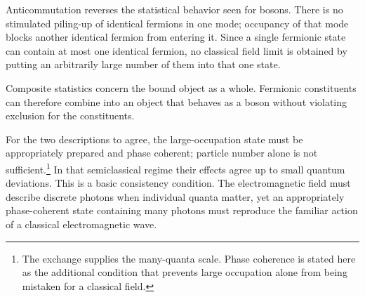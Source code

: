Anticommutation reverses the statistical behavior seen for bosons. There is no stimulated piling-up of identical fermions in one mode; occupancy of that mode blocks another identical fermion from entering it. Since a single fermionic state can contain at most one identical fermion, no classical field limit is obtained by putting an arbitrarily large number of them into that one state.

\begin{classroomqa}
\end{classroomqa}

Composite statistics concern the bound object as a whole. Fermionic constituents can therefore combine into an object that behaves as a boson without violating exclusion for the constituents.

\begin{classroomqa}
\end{classroomqa}

For the two descriptions to agree, the large-occupation state must be appropriately prepared and phase coherent; particle number alone is not sufficient.\footnote{The exchange supplies the many-quanta scale. Phase coherence is stated here as the additional condition that prevents large occupation alone from being mistaken for a classical field.} In that semiclassical regime their effects agree up to small quantum deviations. This is a basic consistency condition. The electromagnetic field must describe discrete photons when individual quanta matter, yet an appropriately phase-coherent state containing many photons must reproduce the familiar action of a classical electromagnetic wave.
